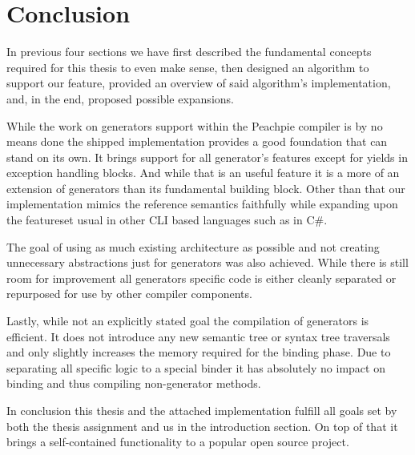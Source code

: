 \chapter*{Conclusion}

In previous four sections we have first described the fundamental concepts required for this thesis to even make sense, then designed an algorithm to support our feature, provided an overview of said algorithm's implementation, and, in the end, proposed possible expansions.

While the work on generators support within the Peachpie compiler is by no means done the shipped implementation provides a good foundation that can stand on its own. It brings support for all generator’s features except for yields in exception handling blocks. And while that is an useful feature it is a more of an extension of generators than its fundamental building block. Other than that our implementation mimics the reference semantics faithfully while expanding upon the featureset usual in other CLI based languages such as in C\#.

The goal of using as much existing architecture as possible and not creating unnecessary abstractions just for generators was also achieved. While there is still room for improvement all generators specific code is either cleanly separated or repurposed for use by other compiler components.

Lastly, while not an explicitly stated goal the compilation of generators is efficient. It does not introduce any new semantic tree or syntax tree traversals and only slightly increases the memory required for the binding phase. Due to separating all specific logic to a special binder it has absolutely no impact on binding and thus compiling non-generator methods.

In conclusion this thesis and the attached implementation fulfill all goals set by both the thesis assignment and us in the introduction section. On top of that it brings a self-contained functionality to a popular open source project.
